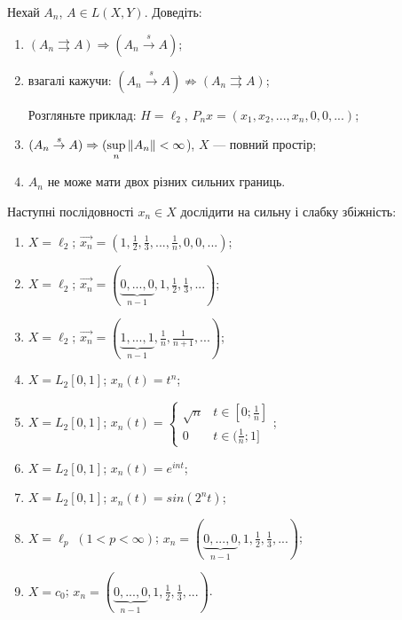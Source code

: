 \begin{exercise}
    Нехай $A_n$, $A \in L(X, Y)$. Доведіть: 
    \begin{enumerate}
        \item $(A_n \rightrightarrows A) \Rightarrow (A_n 
        \overset{s}{\rightarrow} A)$;
        \item взагалі кажучи: $(A_n 
        \overset{s}{\rightarrow} A) \nRightarrow (A_n \rightrightarrows A)$;

        Розгляньте приклад: $H = \ell_2$, $P_nx = (x_1, x_2, ..., x_n, 0, 0, ...)$;

        \item $(A_n \overset{s}{\rightarrow} A) \Rightarrow (\underset{n}{\sup}\left\lVert A_n\right\rVert 
        < \infty$), $X$ --- повний простір;

        \item $A_n$ не може мати двох різних сильних границь.
    \end{enumerate}
\end{exercise}

\begin{exercise}
    Наступні послідовності $x_n \in X$ дослідити на сильну і слабку збіжність: 
    \begin{enumerate}
        \item $X = \ell_2$; $\vec{x_n} = (1, \frac{1}{2}, \frac{1}{3}, ..., \frac{1}{n}, 0, 0
        , ...)$;
        \item $X = \ell_2$; $\vec{x_n} = ( \underbrace{0, ..., 0}_{n-1} ,
        1, \frac{1}{2}, \frac{1}{3}, ...)$;
        \item $X = \ell_2$; $\vec{x_n} = ( \underbrace{1, ..., 1}_{n-1} ,
        \frac{1}{n}, \frac{1}{n+1}, ...)$;
        \item $X = L_2[0, 1]$; $x_n(t) = t^n$;
        \item $X = L_2[0, 1]$; $x_n(t) =  \begin{cases}
            \sqrt{n} & t \in [0; \frac{1}{n}] \\
            0 & t \in (\frac{1}{n}; 1]
        \end{cases}$;
        \item $X = L_2[0, 1]$; $x_n(t) = e^{int}$;
        \item $X = L_2[0, 1]$; $x_n(t) = sin(2^nt)$;
        \item $X = \ell_p \; (1 < p < \infty)$; $x_n = ( \underbrace{0, ..., 0}_{n-1} ,
        1, \frac{1}{2}, \frac{1}{3}, ...)$;
        \item $X = c_0$; $x_n = ( \underbrace{0, ..., 0}_{n-1} ,
        1, \frac{1}{2}, \frac{1}{3}, ...)$.
    \end{enumerate}
\end{exercise}